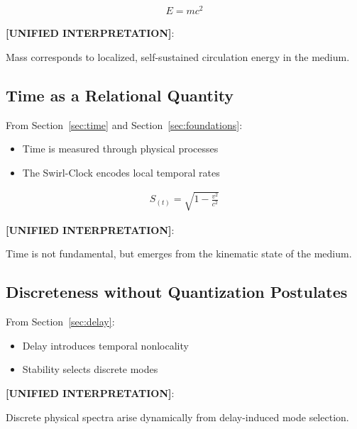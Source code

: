         \begin{align}
            E = m c^2
        \end{align}
        
        \textbf{[UNIFIED INTERPRETATION]}:
        \begin{center}
            Mass corresponds to localized, self-sustained circulation energy in the medium.
        \end{center}
    
    \subsection{Time as a Relational Quantity}
        
        From Section~\ref{sec:time} and Section~\ref{sec:foundations}:
        
        \begin{itemize}
            \item Time is measured through physical processes
            \item The Swirl-Clock encodes local temporal rates
        \end{itemize}
        
        \begin{align}
            S_{(t)} = \sqrt{1 - \frac{v^2}{c^2}}
        \end{align}
        
        \textbf{[UNIFIED INTERPRETATION]}:
        \begin{center}
            Time is not fundamental, but emerges from the kinematic state of the medium.
        \end{center}
    
    \subsection{Discreteness without Quantization Postulates}
        
        From Section~\ref{sec:delay}:
        
        \begin{itemize}
            \item Delay introduces temporal nonlocality
            \item Stability selects discrete modes
        \end{itemize}
        
        \textbf{[UNIFIED INTERPRETATION]}:
        \begin{center}
            Discrete physical spectra arise dynamically from delay-induced mode selection.
        \end{center}
        
